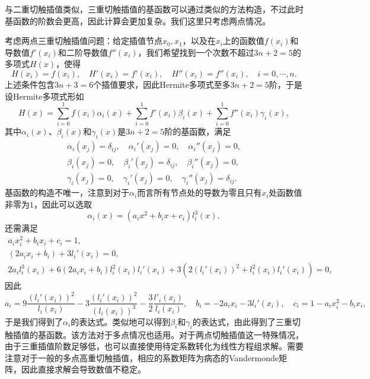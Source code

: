 \documentclass[a4paper,10pt]{ctexart}
\begin{document}
与二重切触插值类似，三重切触插值的基函数可以通过类似的方法构造，不过此时基函数的阶数会更高，因此计算会更加复杂。我们这里只考虑两点情况。

\begin{example}
    考虑两点三重切触插值问题：给定插值节点$ x_0,x_1 $，以及在$ x_i $上的函数值$ f(x_i) $和导数值$ f'(x_i) $和二阶导数值$ f''(x_i) $，我们希望找到一个次数不超过$ 3n+2 = 5 $的多项式$ H(x) $，使得
    \[
        H(x_i)=f(x_i),\quad H'(x_i)=f'(x_i),\quad H''(x_i)=f''(x_i),\quad i=0,\cdots ,n.
    \]
    上述条件包含$ 3n+3 = 6 $个插值要求，因此Hermite多项式至多$ 3n+2 = 5 $阶，于是设Hermite多项式形如
    \begin{equation}
        H(x)=\sum_{i=0}^{1}f(x_i)\alpha_i(x)+\sum_{i=0}^{1}f'(x_i)\beta_i(x)+\sum_{i=0}^{1}f''(x_i)\gamma_i(x),
    \end{equation}
    其中$ \alpha_i(x) $、$ \beta_i(x) $和$ \gamma_i(x) $是$ 3n+2=5 $阶的基函数，满足
    \[
        \begin{aligned}
            \alpha_i(x_j)=\delta_{ij},\quad \alpha_i'(x_j)=0,\quad \alpha_i''(x_j)=0,\\
            \beta_i(x_j)=0,\quad \beta_i'(x_j)=\delta_{ij},\quad \beta_i''(x_j)=0,\\
            \gamma_i(x_j)=0,\quad \gamma_i'(x_j)=0,\quad \gamma_i''(x_j)=\delta_{ij}.
        \end{aligned}
    \]
    基函数的构造不唯一，注意到对于$ \alpha_i $而言所有节点处的导数为零且只有$ x_i $处函数值非零为$ 1 $，因此可以选取
    \begin{equation}
        \alpha_i(x) = (a_ix^2+b_ix+c_i)l^3_i(x),
    \end{equation}
    还需满足
    \[
        \begin{aligned}
            a_ix_i^2+b_ix_i+c_i = 1,\\
            (2a_ix_i+b_i)+3l_i'(x_i) = 0,\\
            2a_il_i^3(x_i)+6(2a_ix_i+b_i)l_i^2(x_i) l_i'(x_i) + 3(2(l_i'(x_i))^2+l_i^2(x_i)l_i'(x_i)) = 0,
        \end{aligned}
    \]
    因此
    \[
        a_i = 9 \frac{(l_i'(x_i))^2}{l_i(x_i)}-3 \frac{(l_i'(x_i))^2}{(l_i(x_i))^3} - \frac{3}{2} \frac{l'_i(x_i)}{l_i(x_i)},\quad b_i = -2a_i x_i - 3l_i'(x_i),\quad c_i = 1- a_i x_i^2 - b_i x_i,
    \]
    于是我们得到了$ \alpha_i $的表达式。类似地可以得到$ \beta_i $和$ \gamma_i $的表达式，由此得到了三重切触插值的基函数。该方法对于多点情况也适用。对于两点切触插值这一特殊情况，由于三重插值阶数足够低，也可以直接使用待定系数转化为线性方程组求解。需要注意对于一般的多点高重切触插值，相应的系数矩阵为病态的Vandermonde矩阵，因此直接求解会导致数值不稳定。
\end{example}
\end{document}
